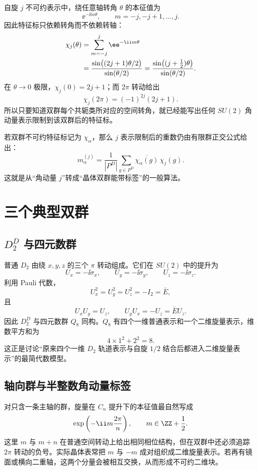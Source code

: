 自旋 $j$ 不可约表示中，绕任意轴转角 $\theta$ 的本征值为
\[
\ee^{-\ii m\theta},
\qquad m=-j,-j+1,\dots,j.
\]
因此特征标只依赖转角而不依赖转轴：
\begin{align}
\chi_j(\theta)
&=\sum_{m=-j}^{j}\ee^{-\ii m\theta}\notag\\
&=\frac{\sin\bigl((2j+1)\theta/2\bigr)}{\sin(\theta/2)}
=\frac{\sin\bigl((j+\tfrac12)\theta\bigr)}{\sin(\theta/2)}.
\label{eq:su2-character-angle}
\end{align}
在 $\theta\to0$ 极限，$\chi_j(0)=2j+1$；而 $2\pi$ 转动给出
\begin{equation}
\chi_j(2\pi)=(-1)^{2j}(2j+1).
\label{eq:central-double-character}
\end{equation}
所以只要知道双群每个共轭类所对应的空间转角，就已经能写出任何 $SU(2)$ 角动量表示限制到该双群后的特征标。

若双群不可约特征标记为 $\chi_\alpha$，那么 $j$ 表示限制后的重数仍由有限群正交公式给出：
\begin{equation}
m_\alpha^{(j)}
=\frac1{|P^D|}\sum_{g\in P^D}
\overline{\chi_\alpha(g)}\,\chi_j(g).
\label{eq:double-group-multiplicity}
\end{equation}
这就是从“角动量 $j$”转成“晶体双群能带标签”的一般算法。

\section{三个典型双群}

\subsection{\texorpdfstring{$D_2^D$ 与四元数群}{D2 双群与四元数群}}

普通 $D_2$ 由绕 $x,y,z$ 的三个 $\pi$ 转动组成。它们在 $SU(2)$ 中的提升为
\[
U_x=-\ii\sigma_x,
\qquad
U_y=-\ii\sigma_y,
\qquad
U_z=-\ii\sigma_z.
\]
利用 Pauli 代数，
\[
U_x^2=U_y^2=U_z^2=-I_2=\bar E,
\]
且
\[
U_xU_y=U_z,
\qquad
U_yU_x=-U_z=\bar E U_z.
\]
因此 $D_2^D$ 与四元数群 $Q_8$ 同构。$Q_8$ 有四个一维普通表示和一个二维旋量表示，维数平方和为
\[
4\times1^2+2^2=8.
\]
这正是讨论“原来四个一维 $D_2$ 轨道表示与自旋 $1/2$ 结合后都进入二维旋量表示”的最简代数模型。

\subsection{轴向群与半整数角动量标签}

对只含一条主轴的群，旋量在 $C_n$ 提升下的本征值最自然写成
\[
\exp\left(-\ii m\frac{2\pi}{n}\right),
\qquad m\in\ZZ+\frac12.
\]
这里 $m$ 与 $m+n$ 在普通空间转动上给出相同相位结构，但在双群中还必须追踪 $2\pi$ 转动的负号。实际晶体表常把 $m$ 与 $-m$ 成对组织成二维旋量表示。若再有镜面或横向二重轴，这两个分量会被相互交换，从而形成不可约二维块。

